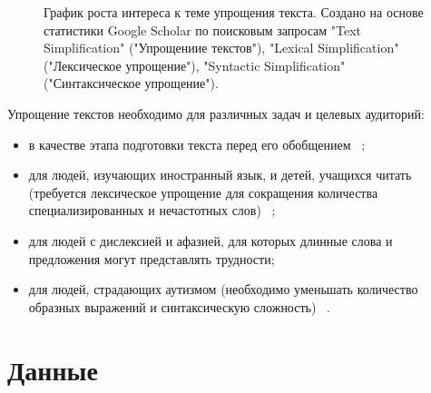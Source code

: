 \begin{figure}[h!]
	
	
	\caption{График роста интереса к теме упрощения текста. Создано на основе статистики Google Scholar по поисковым запросам "Text Simplification" ("Упрощениие текстов"),  "Lexical Simplification" ("Лексическое упрощение"), "Syntactic Simplification" ("Синтаксическое упрощение")\cite{sikka_survey_2020}.}
	
	\label{fig:growth_of_interest}
	
\end{figure}

Упрощение текстов необходимо для различных задач и целевых аудиторий: 
\begin{itemize}
	\item в качестве этапа подготовки текста перед его обобщением ~\cite{finegan_dollak_sentence_2016}; 
	\item для людей, изучающих иностранный язык, и детей, учащихся читать (требуется лексическое упрощение для сокращения количества специализированных и нечастотных слов) ~\cite{liu_simplification_2016};
	\item для людей с дислексией и афазией, для которых длинные слова и предложения могут представлять трудности;
	\item для людей, страдающих аутизмом (необходимо уменьшать количество образных выражений и синтаксическую сложность) ~\cite{evans_evaluation_2014}.
\end{itemize}

\section{Данные}


